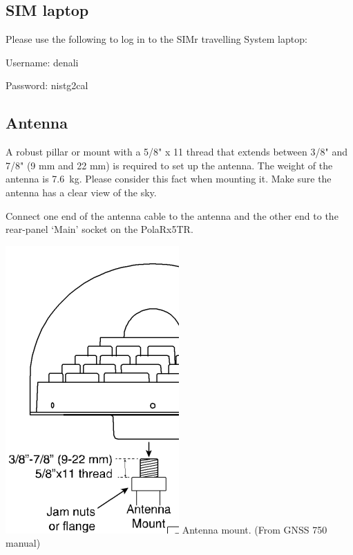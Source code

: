 \documentclass[11pt]{article}
\begin{document}
\subsection{SIM laptop}
Please use the following to log in to the SIMr travelling System laptop:

Username: denali

Password: nistg2cal

\subsection{Antenna}

\begin{minipage}{0.75\textwidth}
A robust pillar or mount with a 5/8" x 11 thread that extends between 3/8" and 7/8" (9 mm and 22 mm)  is required to set up the antenna. The weight of the antenna is \SI{7.6}{\kilo\gram}. Please consider this fact when mounting it. Make sure the antenna has a clear view of the sky.


Connect one end of the antenna cable to the antenna
and the other end to the rear-panel ‘Main’ socket on
the PolaRx5TR. 
\end{minipage}
\begin{minipage}{0.25\textwidth}
\includegraphics[width=0.9\linewidth]{Figures/antenamount}
Antenna mount. (From GNSS 750 manual)
\end{minipage}
\end{document}

